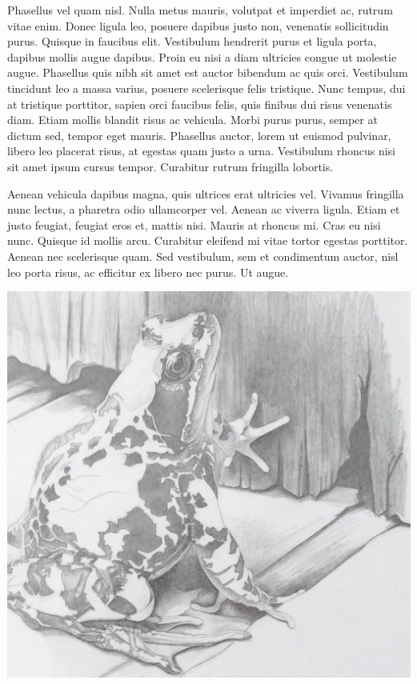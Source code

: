 \documentclass{amsbook}
\begin{document}
Phasellus vel quam nisl. Nulla metus mauris, volutpat et imperdiet ac, rutrum vitae enim. Donec ligula leo, posuere dapibus justo non, venenatis sollicitudin purus. Quisque in faucibus elit. Vestibulum hendrerit purus et ligula porta, dapibus mollis augue dapibus. Proin eu nisi a diam ultricies congue ut molestie augue. Phasellus quis nibh sit amet est auctor bibendum ac quis orci. Vestibulum tincidunt leo a massa varius, posuere scelerisque felis tristique. Nunc tempus, dui at tristique porttitor, sapien orci faucibus felis, quis finibus dui risus venenatis diam. Etiam mollis blandit risus ac vehicula. Morbi purus purus, semper at dictum sed, tempor eget mauris. Phasellus auctor, lorem ut euismod pulvinar, libero leo placerat risus, at egestas quam justo a urna. Vestibulum rhoncus nisi sit amet ipsum cursus tempor. Curabitur rutrum fringilla lobortis.

Aenean vehicula dapibus magna, quis ultrices erat ultricies vel. Vivamus fringilla nunc lectus, a pharetra odio ullamcorper vel. Aenean ac viverra ligula. Etiam et justo feugiat, feugiat eros et, mattis nisi. Mauris at rhoncus mi. Cras eu nisi nunc. Quisque id mollis arcu. Curabitur eleifend mi vitae tortor egestas porttitor. Aenean nec scelerisque quam. Sed vestibulum, sem et condimentum auctor, nisl leo porta risus, ac efficitur ex libero nec purus. Ut augue.

\clearpage

\thispagestyle{empty}
\vspace*{\fill}
{\centering
\includegraphics[width=\textwidth]{images/vernal.jpg}}
\vspace*{\fill}
\clearpage
\end{document}
